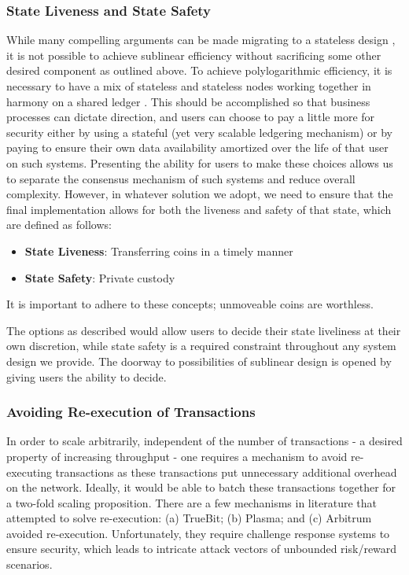 \documentclass[peerreview]{ieeesyscoin}
\begin{document}
\subsubsection{State Liveness and State Safety}

While many compelling arguments can be made migrating to a stateless design \cite{Hot19}, it is not possible to achieve sublinear efficiency without sacrificing some other desired component as outlined above. To achieve polylogarithmic efficiency, it is necessary to have a mix of stateless and stateless nodes working together in harmony on a shared ledger \cite{Hot19}. This should be accomplished so that business processes can dictate direction, and users can choose to pay a little more for security either by using a stateful (yet very scalable ledgering mechanism) or by paying to ensure their own data availability amortized over the life of that user on such systems. Presenting the ability for users to make these choices allows us to separate the consensus mechanism of such systems and reduce overall complexity. However, in whatever solution we adopt, we need to ensure that the final implementation allows for both the liveness and safety of that state, which are defined as follows:

\begin{itemize}
\item \textbf{State Liveness}: Transferring coins in a timely manner
\item \textbf{State Safety}:  Private custody
\end{itemize}

It is important to adhere to these concepts; unmoveable coins are worthless.

The options as described would allow users to decide their state liveliness at their own discretion, while state safety is a required constraint throughout any system design we provide. The doorway to possibilities of sublinear design is opened by giving users the ability to decide.


\subsubsection{Avoiding Re-execution of Transactions}

In order to scale arbitrarily, independent of the number of transactions - a desired property of increasing throughput - one requires a mechanism to avoid re-executing transactions \cite{Bow18} as these transactions put unnecessary additional overhead on the network. Ideally, it would be able to batch these transactions together for a two-fold scaling proposition. There are a few mechanisms in literature that attempted to solve re-execution: (a) TrueBit; (b) Plasma; and (c) Arbitrum avoided re-execution. Unfortunately, they require challenge response systems to ensure security, which leads to intricate attack vectors of unbounded risk/reward scenarios. 
\end{document}
